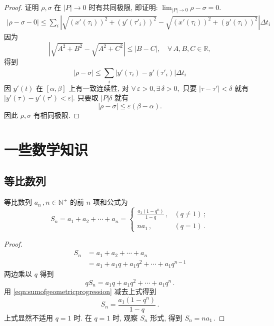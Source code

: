 \documentclass{book}
\newcommand{\Exists}{\exists\,}
\newcommand{\Any}{\forall\,}
\newcommand{\abs}[1]{\left\lvert #1 \right\rvert}
\newcommand{\R}{\mathbb{R}}
\newcommand{\N}{\mathbb{N}}
\renewcommand{\le}{\leqslant}
\numberwithin{equation}{section}
\numberwithin{figure}{section}
\theoremstyle{definition}
\begin{document}
\hypertarget{proof:ArcLength}{}
\begin{proof}
  证明 $\rho,\sigma$ 在 $\abs{P}\to0$ 时有共同极限, 即证明: $\lim_{\abs{P}\to0}\rho-\sigma=0$.
  \begin{align*}
    \abs{\rho-\sigma-0}\le\sum_{i}^{}\abs{\sqrt{(x'(\tau_i))^2+(y'(\tau'_i))^2}-\sqrt{(x'(\tau_i))^2+(y'(\tau_i))^2}}\Delta t_i
  \end{align*}
  因为
  \begin{equation*}
    \abs{\sqrt{A^2+B^2}-\sqrt{A^2+C^2}}\le\abs{B-C},\quad \Any A,B,C\in\R,
  \end{equation*}
  得到
  \begin{equation*}
    \abs{\rho-\sigma}\le\sum_{i}^{}\abs{y'(\tau_i)-y'(\tau'_i)}\Delta t_i
  \end{equation*}
  因 $y'(t)$ 在 $[\alpha,\beta]$ 上有一致连续性, 对 $\Any \varepsilon>0,\Exists \delta>0,$ 只要 $\abs{\tau-\tau'}<\delta$ 就有 $\abs{y'(\tau)-y'(\tau')<\varepsilon}$. 只要取 $\abs{P}\delta$ 就有
  \begin{equation*}
    \abs{\rho-\sigma}\le\varepsilon(\beta-\alpha).
  \end{equation*}
  因此 $\rho,\sigma$ 有相同极限.
\end{proof}

\chapter{一些数学知识}
\section{等比数列}
等比数列 ${a_n}\,,n\in\N^+$ 的前 $n$ 项和公式为
\begin{equation*}
  S_n=a_1+a_2+\cdots+a_n=
  \begin{cases}
    \frac{a_1(1-q^n)}{1-q}\,,&(q\neq1)\,;\\
    na_1\,,&(q=1)\,.
  \end{cases}
\end{equation*}
\begin{proof}
  \begin{align}
    S_n&=a_1+a_2+\cdots+a_n\nonumber\\
    &=a_1+a_1 q+a_1 q^2+\cdots+a_1 q^{n-1}\label{eqn:sumofgeometricprogression}
  \end{align}
  两边乘以 $q$ 得到
  \begin{equation*}
    qS_n=a_1 q+a_1q^2+\cdots+a_1q^{n}\,.
  \end{equation*}
  用 \cref{eqn:sumofgeometricprogression} 减去上式得到
  \begin{equation*}
    S_n=\frac{a_1\left( 1-q^n \right)}{1-q}\,.
  \end{equation*}
  上式显然不适用 $q=1$ 时.
  在 $q=1$ 时, 观察 $S_n$ 形式, 得到
  $S_n=na_1$\,.
\end{proof}
\end{document}
